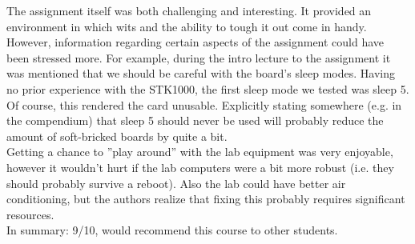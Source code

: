 The assignment itself was both challenging and interesting.
It provided an environment in which wits and the ability to tough it out come in handy.
However, information regarding certain aspects of the assignment could have been stressed more.
For example, during the intro lecture to the assignment\cite{lab-intro-lecture} it was mentioned that we should be careful with the board's sleep modes.
Having no prior experience with the STK1000, the first sleep mode we tested was sleep 5.
Of course, this rendered the card unusable.
Explicitly stating somewhere (e.g. in the compendium) that sleep 5 should never be used will probably reduce the amount of soft-bricked boards by quite a bit.
\\
Getting a chance to ''play around'' with the lab equipment was very enjoyable, however it wouldn't hurt if the lab computers were a bit more robust (i.e. they should probably survive a reboot).
Also the lab could have better air conditioning, but the authors realize that fixing this probably requires significant resources.
\\
In summary: 9/10, would recommend this course to other students.
